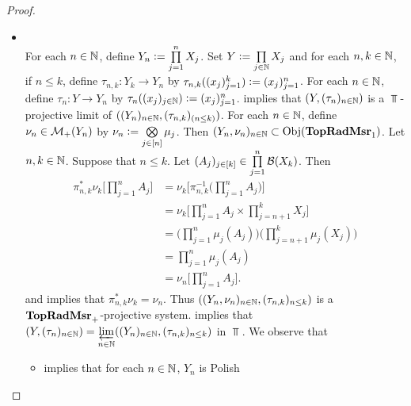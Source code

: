 \documentclass{book}
\begin{document}
\begin{proof}\
	\begin{itemize}
		\item {} \\
		For each $n \in \mathbb{N}$, define $Y_n \vcentcolon= \prod\limits_{j=1}^n X_j$. Set $Y \vcentcolon= \prod\limits_{j \in \mathbb{N}} X_j$ and for each $n,k \in \mathbb{N}$, if $n \leq k$, define $\tau_{n,k}: Y_k \rightarrow Y_n$ by $\tau_{n,k}((x_j)_{j=1}^k) \vcentcolon= (x_j)_{j=1}^n$. For each $n \in \mathbb{N}$, define $\tau_n: Y \rightarrow Y_n$ by $\tau_n((x_j)_{j \in \mathbb{N}}) \vcentcolon= (x_j)_{j=1}^n$.  implies that $(Y, (\tau_n)_{n \in \mathbb{N}})$ is a $\Top$-projective limit of $((Y_n)_{n \in \mathbb{N}}, (\tau_{n,k})_{(n \leq k)})$. For each $n \in \mathbb{N}$, define $\nu_n \in \mathcal{M}_+(Y_n)$ by $\nu_n \vcentcolon= \bigotimes\limits_{j \in [n]} \mu_j$.  Then $(Y_n, \nu_n)_{n \in \mathbb{N}} \subset \operatorname{Obj}(\operatorname*{\text{\textbf{TopRadMsr}}_{1}})$. Let $n,k \in \mathbb{N}$. Suppose that $n \leq k$. Let $(A_j)_{j \in [k]} \in \prod\limits_{j=1}^n \mathcal{B}(X_k)$. Then
		\begin{align*}
			\pi_{n,k}^*\nu_k\bigg[ \prod\limits_{j=1}^n A_j \bigg] 
			& = \nu_k \bigg[ \pi_{n,k}^{-1} \bigg( \prod\limits_{j=1}^n A_j \bigg) \bigg] \\
			& = \nu_k \bigg[ \prod\limits_{j=1}^n A_j \times \prod\limits_{j=n+1}^k X_j \bigg] \\
			& = \bigg( \prod\limits_{j = 1}^n \mu_j(A_j)  \bigg) \bigg( \prod\limits_{j=n+1}^k \mu_j(X_j) \bigg) \\
			& = \prod\limits_{j = 1}^n \mu_j(A_j) \\
			& = \nu_n \bigg[ \prod\limits_{j=1}^n A_j \bigg].
		\end{align*}
		  and  implies that $\pi_{n,k}^*\nu_k = \nu_n$. Thus $((Y_n, \nu_n)_{n \in \mathbb{N}}, (\tau_{n,k})_{n \leq k})$ is a $\operatorname*{\text{\textbf{TopRadMsr}}_{+}}$-projective system.  	implies that $(Y, (\tau_n)_{n \in \mathbb{N}}) = \varprojlim\limits_{n \in \mathbb{N}} ((Y_n)_{n \in \mathbb{N}}, (\tau_{n, k})_{n \leq k})$ in $\Top$.  We observe that 
		\begin{itemize}
			\item {} implies that for each $n \in \mathbb{N}$, $Y_n$ is Polish

\end{itemize}
\end{itemize}
\end{proof}
\end{document}
